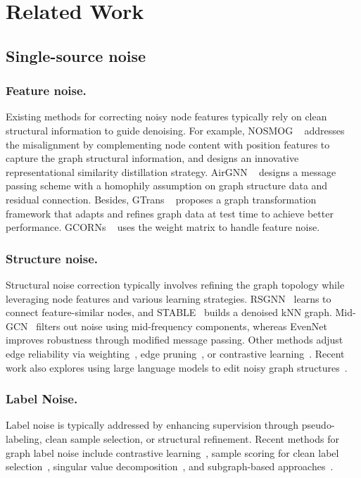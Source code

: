 \documentclass[sigconf, anonymous, review]{acmart}
\begin{document}
\section{Related Work}
  \subsection{Single-source noise}
    \subsubsection{Feature noise.}
    Existing methods for correcting noisy node features typically rely on clean structural information to guide denoising. For example, NOSMOG ~\cite{tian2022learning} addresses the misalignment by complementing node content with position features to capture the graph structural information, and designs an innovative representational similarity distillation strategy. AirGNN ~\cite{liu2021graph}  designs a message passing scheme with a homophily assumption on graph
    structure data and residual connection. Besides, GTrans ~\cite{jin2022empowering} proposes a graph transformation framework that adapts and refines graph data at test time to achieve better performance. GCORNs ~\cite{abbahaddou2024bounding} uses the weight matrix to handle feature noise.
    
    \subsubsection{Structure noise.}
    Structural noise correction typically involves refining the graph topology while leveraging node features and various learning strategies. RSGNN~\cite{dai2022towards} learns to connect feature-similar nodes, and STABLE~\cite{li2022reliable} builds a denoised kNN graph. Mid-GCN~\cite{huang2023robust} filters out noise using mid-frequency components, whereas EvenNet~\cite{lei2022evennet} improves robustness through modified message passing. Other methods adjust edge reliability via weighting~\cite{jo2023robust, chen2025l2m}, edge pruning~\cite{song2023rge}, or contrastive learning~\cite{zhuang2025refine}. Recent work also explores using large language models to edit noisy graph structures~\cite{guo2024graphedit}.
    
    \subsubsection{Label Noise.}
    Label noise is typically addressed by enhancing supervision through pseudo-labeling, clean sample selection, or structural refinement. Recent methods for graph label noise include contrastive learning~\cite{li2024contrastive, lu2024noise, yuan2023learning, qian2024rlgnn}, sample scoring for clean label selection~\cite{wu2024mitigating, li2023graphcleaner, qian2023robust, dai2021nrgnn}, singular value decomposition~\cite{yuan2023alex}, and subgraph-based approaches~\cite{yin2024sport}.
    
\end{document}
